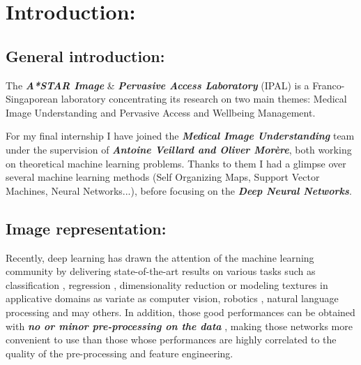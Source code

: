 \documentclass[a4paper,11pt]{report}
\newcommand{\Important}[1]{\textbf{{\em #1}}}
\begin{document}
	\vfill	
		
	\newpage
	\thispagestyle{empty}
	\mbox{}
 
	\setcounter{tocdepth}{3}
	\renewcommand{\contentsname}{Contents:}
	\tableofcontents
	\clearpage

	\renewcommand{\listfigurename}{List of figures:}
	\listoffigures

\chapter{Introduction:}
	\label{chap:Introduction}

	
	\section{General introduction:}
		\label{seq:Introduction/General introduction}
		The \Important{A*STAR Image} \& \Important{Pervasive Access Laboratory} (IPAL) is a Franco-Singaporean laboratory concentrating its research on two main themes: Medical Image Understanding and Pervasive Access and Wellbeing Management.\\\par
  
		For my final internship I have joined the \Important{Medical Image Understanding} team under the supervision of \Important{Antoine Veillard and Oliver Morère}, both working on theoretical machine learning problems. Thanks to them I had a glimpse over several machine learning methods (Self Organizing Maps, Support Vector Machines, Neural Networks...), before focusing on the \Important{Deep Neural Networks}.

		
	\section{Image representation:}
		\label{seq:Introduction/Deep neural architecture}
		Recently, deep learning has drawn the attention of the machine learning community by delivering state-of-the-art results on various tasks such as classification \cite{Ahmed_2008, Bengio_2007, Larochelle_2007, Ranzato_2008, Vincent_2008}, regression \cite{Salakhutdinov_2009}, dimensionality reduction \cite{Hinton_2006, Salakhutdinov_2007} or modeling textures \cite{Osindero_2008} in applicative domains as variate as computer vision, robotics \cite{Hadsell_2008}, natural language processing \cite{Collobert_2008, Mnih_2009} and may others. In addition, those good performances can be  obtained with \Important{no or minor pre-processing on the data} \cite{Bengio_2009, Saxe_2013}, making those networks more convenient to use than those whose performances are highly correlated to the quality of the pre-processing and feature engineering.\\\par
  
\end{document}
